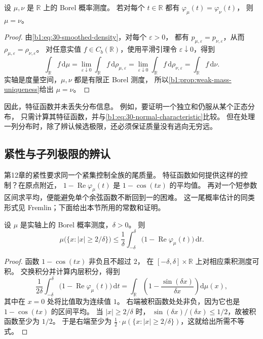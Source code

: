 \begin{theorem}[特征函数的唯一性]\label{b1:thm:30-characteristic-uniqueness}
设 \(\mu,\nu\) 是 \(\mathbb R\) 上的 Borel 概率测度。
若对每个 \(t\in\mathbb R\) 都有 \(\varphi_\mu(t)=\varphi_\nu(t)\)，
则 \(\mu=\nu\)。
\end{theorem}
\begin{proof}
由\eqref{b1:eq:30-smoothed-density}，对每个 \(\varepsilon>0\)，
都有 \(p_{\mu,\varepsilon}=p_{\nu,\varepsilon}\)，从而
\(\rho_{\mu,\varepsilon}=\rho_{\nu,\varepsilon}\)。
对任意实值 \(f\in C_b(\mathbb R)\)，使用平滑引理令 \(\varepsilon\downarrow0\)，得到
\[
 \int_{\mathbb R}f\,\mathrm d\mu
 =\lim_{\varepsilon\downarrow0}\int_{\mathbb R}f\,\mathrm d\rho_{\mu,\varepsilon}
 =\lim_{\varepsilon\downarrow0}\int_{\mathbb R}f\,\mathrm d\rho_{\nu,\varepsilon}
 =\int_{\mathbb R}f\,\mathrm d\nu.
\]
实轴是度量空间，\(\mu,\nu\) 都是有限正 Borel 测度，
所以\cref{b1:prop:weak-mass-uniqueness}给出 \(\mu=\nu\)。
\end{proof}

因此，特征函数并未丢失分布信息。
例如，要证明一个独立和仍服从某个正态分布，
只需计算其特征函数，并与\eqref{b1:eq:30-normal-characteristic}比较。
但在处理一列分布时，除了辨认候选极限，还必须保证质量没有逃向无穷远。

\subsection{紧性与子列极限的辨认}
\label{b1:subsec:300603}

第12章的紧性要求同一个紧集控制全族的尾质量。
特征函数如何提供这样的控制？在原点附近，
\(1-\operatorname{Re}\varphi_\mu(t)\) 是 \(1-\cos(tx)\) 的平均值。
再对一个短参数区间求平均，便能避免单个余弦函数不断回到一的困难。
这一尾概率估计的同类形式见
Fremlin\cite[285J]{Fremlin2016Measure}；下面给出本节所用的常数和证明。

\begin{lemma}\label{b1:lem:30-characteristic-tail}
设 \(\mu\) 是实轴上的 Borel 概率测度，\(\delta>0\)。
则
\begin{equation}\label{b1:eq:30-characteristic-tail}
 \mu\bigl(\{x:|x|\geq2/\delta\}\bigr)
 \leq\frac{1}{\delta}\int_{-\delta}^{\delta}
       \bigl(1-\operatorname{Re}\varphi_\mu(t)\bigr)\,\mathrm dt.
\end{equation}
\end{lemma}
\begin{proof}
函数 \(1-\cos(tx)\) 非负且不超过 \(2\)，
在 \([-\delta,\delta]\times\mathbb R\) 上对相应乘积测度可积。
交换积分并计算内层积分，得到
\[
 \frac{1}{2\delta}\int_{-\delta}^{\delta}
       \bigl(1-\operatorname{Re}\varphi_\mu(t)\bigr)\,\mathrm dt
 =\int_{\mathbb R}\left(1-\frac{\sin(\delta x)}{\delta x}\right)\mathrm d\mu(x),
\]
其中在 \(x=0\) 处将比值取为连续值 \(1\)。
右端被积函数处处非负，因为它也是 \(1-\cos(tx)\) 的区间平均。
当 \(|x|\geq2/\delta\) 时，
\(\sin(\delta x)/(\delta x)\leq1/2\)，故被积函数至少为 \(1/2\)。
于是右端至少为
\(\frac12\cdot\mu(\{x:|x|\geq2/\delta\})\)，这就给出所需不等式。
\end{proof}

